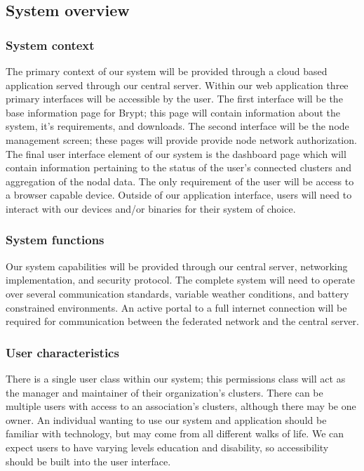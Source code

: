 \documentclass[tikz,a4paper,titlepage]{article}
\begin{document}
\subsection{System overview}
\subsubsection{System context}
The primary context of our system will be provided through a cloud based application served through our central server. Within our web application three primary interfaces will be accessible by the user. The first interface will be the base information page for Brypt; this page will contain information about the system, it’s requirements, and downloads. The second interface will be the node management screen; these pages will provide provide node network authorization. The final user interface element of our system is the dashboard page which will contain information pertaining to the status of the user’s connected clusters and aggregation of the nodal data. The only requirement of the user will be access to a browser capable device. Outside of our application interface, users will need to interact with our devices and/or binaries for their system of choice. 

\subsubsection{System functions}
Our system capabilities will be provided through our central server, networking implementation, and security protocol. The complete system will need to operate over several communication standards, variable weather conditions, and battery constrained environments. An active portal to a full internet connection will be required for communication between the federated network and the central server.

\subsubsection{User characteristics}
There is a single user class within our system; this permissions class will act as the manager and maintainer of their organization’s clusters. There can be multiple users with access to an association's clusters, although there may be one owner. An individual wanting to use our system and application should be familiar with technology, but may come from all different walks of life. We can expect users to have varying levels education and disability, so accessibility should be built into the user interface. 
\end{document}
